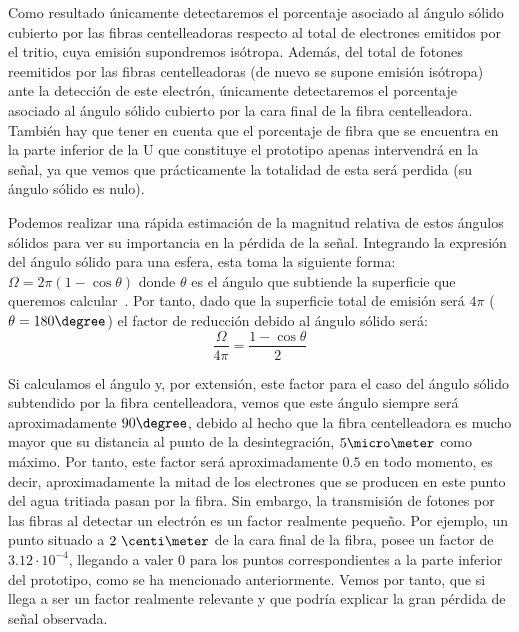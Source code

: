 Como resultado únicamente detectaremos el porcentaje asociado al ángulo sólido cubierto por las fibras centelleadoras respecto al total de electrones emitidos por el tritio, cuya emisión supondremos isótropa. Además, del total de fotones reemitidos por las fibras centelleadoras (de nuevo se supone emisión isótropa) ante la detección de este electrón, únicamente detectaremos el porcentaje asociado al ángulo sólido cubierto por la cara final de la fibra centelleadora. También hay que tener en cuenta que el porcentaje de fibra que se encuentra en la parte inferior de la U que constituye el prototipo apenas intervendrá en la señal, ya que vemos que prácticamente la totalidad de esta será perdida (su ángulo sólido es nulo). 

Podemos realizar una rápida estimación de la magnitud relativa de estos ángulos sólidos para ver su importancia en la pérdida de la señal. Integrando la expresión del ángulo sólido para una esfera, esta toma la siguiente forma: $\Omega=2\pi(1-\cos{\theta})$ donde $\theta$ es el ángulo que subtiende la superficie que queremos calcular~\cite{unizar}. Por tanto, dado que la superficie total de emisión será $4\pi$ ($\theta=180\degree$) el factor de reducción debido al ángulo sólido será:
\begin{equation}
\frac{\Omega}{4\pi}=\frac{1-\cos{\theta}}{2}
\label{factordebidoalangulosolido}
\end{equation}

Si  calculamos el ángulo y, por extensión, este factor para el caso del ángulo sólido subtendido por la fibra centelleadora, vemos que este ángulo siempre será aproximadamente $90\degree$, debido al hecho que la fibra centelleadora es mucho mayor que su distancia al punto de la desintegración, $5\micro\meter$ como máximo. Por tanto, este factor será aproximadamente $0.5$ en todo momento, es decir, aproximadamente la mitad de los electrones que se producen en este punto del agua tritiada pasan por la fibra. Sin embargo, la transmisión de fotones por las fibras al detectar un electrón es un factor realmente pequeño. Por ejemplo, un punto situado a $2~\centi\meter$ de la cara final de la fibra, posee un factor de $3.12\cdotp 10^{-4}$, llegando a valer $0$ para los puntos correspondientes a la parte inferior del prototipo, como se ha mencionado anteriormente. Vemos por tanto, que si llega a ser un factor realmente relevante y que podría explicar la gran pérdida de señal observada. 

